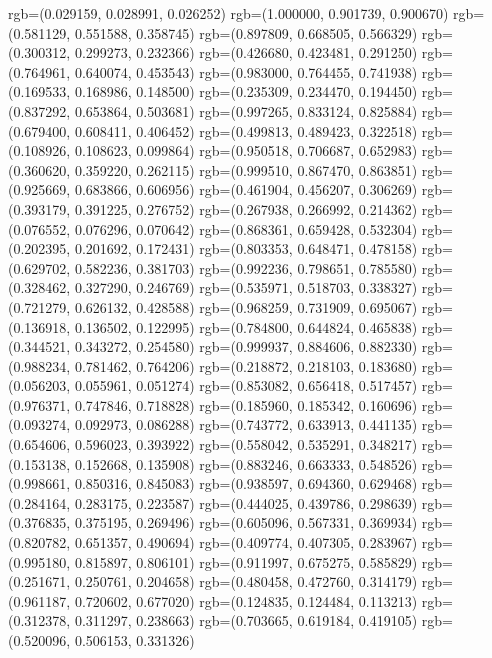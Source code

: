 {{{					rgb=(0.029159, 0.028991, 0.026252)
					rgb=(1.000000, 0.901739, 0.900670)
					rgb=(0.581129, 0.551588, 0.358745)
					rgb=(0.897809, 0.668505, 0.566329)
					rgb=(0.300312, 0.299273, 0.232366)
					rgb=(0.426680, 0.423481, 0.291250)
					rgb=(0.764961, 0.640074, 0.453543)
					rgb=(0.983000, 0.764455, 0.741938)
					rgb=(0.169533, 0.168986, 0.148500)
					rgb=(0.235309, 0.234470, 0.194450)
					rgb=(0.837292, 0.653864, 0.503681)
					rgb=(0.997265, 0.833124, 0.825884)
					rgb=(0.679400, 0.608411, 0.406452)
					rgb=(0.499813, 0.489423, 0.322518)
					rgb=(0.108926, 0.108623, 0.099864)
					rgb=(0.950518, 0.706687, 0.652983)
					rgb=(0.360620, 0.359220, 0.262115)
					rgb=(0.999510, 0.867470, 0.863851)
					rgb=(0.925669, 0.683866, 0.606956)
					rgb=(0.461904, 0.456207, 0.306269)
					rgb=(0.393179, 0.391225, 0.276752)
					rgb=(0.267938, 0.266992, 0.214362)
					rgb=(0.076552, 0.076296, 0.070642)
					rgb=(0.868361, 0.659428, 0.532304)
					rgb=(0.202395, 0.201692, 0.172431)
					rgb=(0.803353, 0.648471, 0.478158)
					rgb=(0.629702, 0.582236, 0.381703)
					rgb=(0.992236, 0.798651, 0.785580)
					rgb=(0.328462, 0.327290, 0.246769)
					rgb=(0.535971, 0.518703, 0.338327)
					rgb=(0.721279, 0.626132, 0.428588)
					rgb=(0.968259, 0.731909, 0.695067)
					rgb=(0.136918, 0.136502, 0.122995)
					rgb=(0.784800, 0.644824, 0.465838)
					rgb=(0.344521, 0.343272, 0.254580)
					rgb=(0.999937, 0.884606, 0.882330)
					rgb=(0.988234, 0.781462, 0.764206)
					rgb=(0.218872, 0.218103, 0.183680)
					rgb=(0.056203, 0.055961, 0.051274)
					rgb=(0.853082, 0.656418, 0.517457)
					rgb=(0.976371, 0.747846, 0.718828)
					rgb=(0.185960, 0.185342, 0.160696)
					rgb=(0.093274, 0.092973, 0.086288)
					rgb=(0.743772, 0.633913, 0.441135)
					rgb=(0.654606, 0.596023, 0.393922)
					rgb=(0.558042, 0.535291, 0.348217)
					rgb=(0.153138, 0.152668, 0.135908)
					rgb=(0.883246, 0.663333, 0.548526)
					rgb=(0.998661, 0.850316, 0.845083)
					rgb=(0.938597, 0.694360, 0.629468)
					rgb=(0.284164, 0.283175, 0.223587)
					rgb=(0.444025, 0.439786, 0.298639)
					rgb=(0.376835, 0.375195, 0.269496)
					rgb=(0.605096, 0.567331, 0.369934)
					rgb=(0.820782, 0.651357, 0.490694)
					rgb=(0.409774, 0.407305, 0.283967)
					rgb=(0.995180, 0.815897, 0.806101)
					rgb=(0.911997, 0.675275, 0.585829)
					rgb=(0.251671, 0.250761, 0.204658)
					rgb=(0.480458, 0.472760, 0.314179)
					rgb=(0.961187, 0.720602, 0.677020)
					rgb=(0.124835, 0.124484, 0.113213)
					rgb=(0.312378, 0.311297, 0.238663)
					rgb=(0.703665, 0.619184, 0.419105)
					rgb=(0.520096, 0.506153, 0.331326)
}}}
